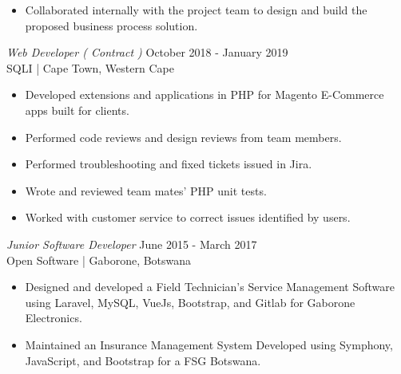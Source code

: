 \documentclass[margin, 10pt]{res}
\begin{document}
\begin{resume}
\begin{itemize}
\item Collaborated internally with the project team to design and build the
proposed business process solution.

\end{itemize} 

{\sl Web Developer ( Contract ) } \hfill October 2018 - January 2019 \\
SQLI | Cape Town, Western Cape 
\begin{itemize} 
\item Developed extensions and applications in PHP for Magento E-Commerce apps built for clients.
\item Performed code reviews and design reviews from team members.
\item Performed troubleshooting and fixed tickets issued in Jira.
\item Wrote and reviewed team mates' PHP unit tests.
\item Worked with customer service to correct issues identified by users.
\end{itemize} 

{\sl Junior Software Developer} \hfill June 2015 - March 2017 \\
Open Software | Gaborone, Botswana
\begin{itemize} \itemsep -2pt %
\item Designed and developed a Field Technician's Service Management Software using Laravel, MySQL, VueJs, Bootstrap, and Gitlab for Gaborone Electronics.
\item Maintained an Insurance Management System Developed using Symphony, JavaScript, and Bootstrap for a FSG Botswana.
\end{itemize}
 

\end{resume}
\end{document}
